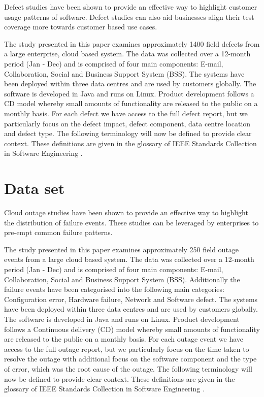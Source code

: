 \documentclass[conference]{IEEEtran}
\begin{document}
Defect studies have been shown to provide an effective way to highlight customer usage patterns of software. Defect studies can also aid businesses align their test coverage more towards customer based use cases. \par
The study presented in this paper examines approximately 1400 field defects from a large enterprise, cloud based system. The data was collected over a 12-month period (Jan - Dec) and is comprised of four main components: E-mail, Collaboration, Social and Business Support System (BSS). The systems have been deployed within three data centres and are used by customers globally. The software is developed in Java and runs on Linux. Product development follows a CD model whereby small amounts of functionality are released to the public on a monthly basis.  For each defect we have access to the full defect report, but we particularly focus on the defect impact, defect component, data centre location and defect type. 
The following terminology will now be defined to provide clear context. These definitions are given in the glossary of IEEE Standards Collection in Software Engineering \cite{ieee1998ieee}. 

\section{Data set}

Cloud outage studies have been shown to provide an effective way to highlight the distribution of failure events. These studies can be leveraged by enterprises to pre-empt common failure patterns. \par

The study presented in this paper examines approximately 250 field outage events from a large cloud based system. The data was collected over a 12-month period (Jan - Dec) and is comprised of four main components: E-mail, Collaboration, Social and Business Support System (BSS). Additionally the failure events have been categorised into the following main categories: Configuration error, Hardware failure, Network and Software defect. The systems have been deployed within three data centres and are used by customers globally. The software is developed in Java and runs on Linux. Product development follows a Continuous delivery (CD) model whereby small amounts of functionality are released to the public on a monthly basis. For each outage event we have access to the full outage report, but we particularly focus on the time taken to resolve the outage with additional focus on the software component and the type of error, which was the root cause of the outage. The following terminology will now be defined to provide clear context. These definitions are given in the glossary of IEEE Standards Collection in Software Engineering \cite{ieee1998ieee}. \par
\end{document}
